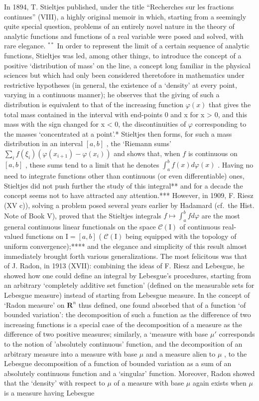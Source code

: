 In 1894, T. Stieltjes published, under the title ``Recherches sur les fractions continues'' (VIII), a highly original memoir in which, starting from a seemingly quite special question, problems of an entirely novel nature in the theory of analytic functions and functions of a real variable were posed and solved, with rare elegance. \(^{**}\) In order to represent the limit of a certain sequence of analytic functions, Stieltjes was led, among other things, to introduce the concept of a positive `distribution of mass' on the line, a concept long familiar in the physical sciences but which had only been considered theretofore in mathematics under restrictive hypotheses (in general, the existence of a `density' at every point, varying in a continuous manner); he observes that the giving of such a distribution is equivalent to that of the increasing function \(\varphi(x)\) that gives the total mass contained in the interval with end-points 0 and x for x \textgreater{} 0, and this mass with the sign changed for x < 0, the discontinuities of \(\varphi\) corresponding to the masses `concentrated at a point'.* Stieltjes then forms, for such a mass distribution in an interval \([a,b]\) , the `Riemann sums' \(\sum_{i} f(\xi_i)(\varphi(x_{i+1}) - \varphi(x_i))\) and shows that, when \(f\) is continuous on \([a,b]\) , these sums tend to a limit that he denotes \(\int_{a}^{b} f(x) d\varphi(x)\) . Having no need to integrate functions other than continuous (or even differentiable) ones, Stieltjes did not push further the study of this integral** and for a decade the concept seems not to have attracted any attention.*** However, in 1909, F. Riesz (XV c)), solving a problem posed several years earlier by Hadamard (cf.~the Hist. Note of Book V), proved that the Stieltjes integrals \(f \mapsto \int_{a}^{b} f d\varphi\) are the most general continuous linear functionals on the space \(\mathcal{C}(\mathrm{I})\) of continuous real-valued functions on \(\mathrm{I} = [a,b]\) ( \(\mathcal{C}(\mathrm{I})\) being equipped with the topology of uniform convergence);**** and the elegance and simplicity of this result almost immediately brought forth various generalizations. The most felicitous was that of J. Radon, in 1913 (XVII): combining the ideas of F. Riesz and Lebesgue, he showed how one could define an integral by Lebesgue's procedures, starting from an arbitrary `completely additive set function' (defined on the measurable sets for Lebesgue measure) instead of starting from Lebesgue measure. In the concept of `Radon measure' on \(\mathbf{R}^n\) thus defined, one found absorbed that of a function `of bounded variation': the decomposition of such a function as the difference of two increasing functions is a special case of the decomposition of a measure as the difference of two positive measures; similarly, a `measure with base \(\mu'\) corresponds to the notion of 'absolutely continuous' function, and the decomposition of an arbitrary measure into a measure with base \(\mu\) and a measure alien to \(\mu\) , to the Lebesgue decomposition of a function of bounded variation as a sum of an absolutely continuous function and a `singular' function. Moreover, Radon showed that the `density' with respect to \(\mu\) of a measure with base \(\mu\) again exists when \(\mu\) is a measure having Lebesgue 